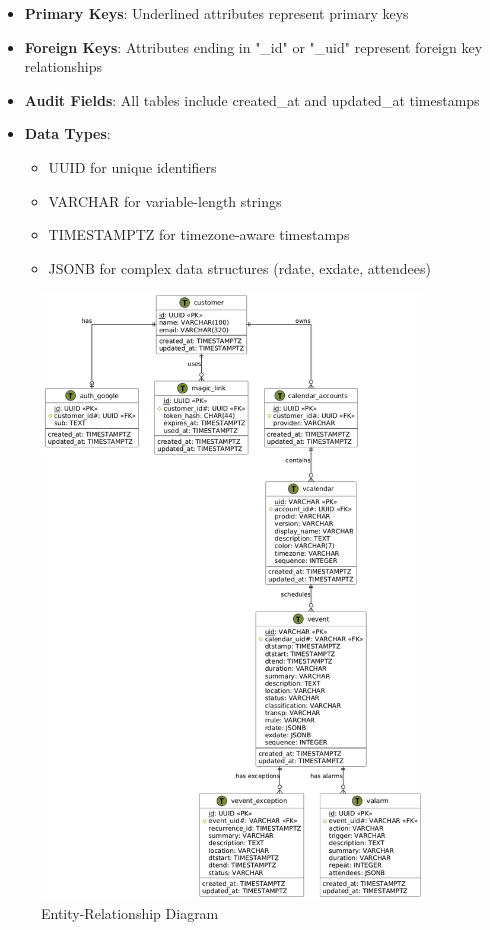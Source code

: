 \documentclass[12pt,a4paper]{report}
\begin{document}
\begin{itemize}
    \item \textbf{Primary Keys}: Underlined attributes represent primary keys
    \item \textbf{Foreign Keys}: Attributes ending in "\_id" or "\_uid" represent foreign key relationships
    \item \textbf{Audit Fields}: All tables include created\_at and updated\_at timestamps
    \item \textbf{Data Types}:
          \begin{itemize}
              \item UUID for unique identifiers
              \item VARCHAR for variable-length strings
              \item TIMESTAMPTZ for timezone-aware timestamps
              \item JSONB for complex data structures (rdate, exdate, attendees)
          \end{itemize}
\end{itemize}

\begin{figure}[!h]
    \centering
    \includegraphics[width=0.9\textwidth]{images/docs/diagrams/er/database/Database Design.png}
    \caption{Entity-Relationship Diagram}
    \label{fig:er-diagram}
\end{figure}
\end{document}
